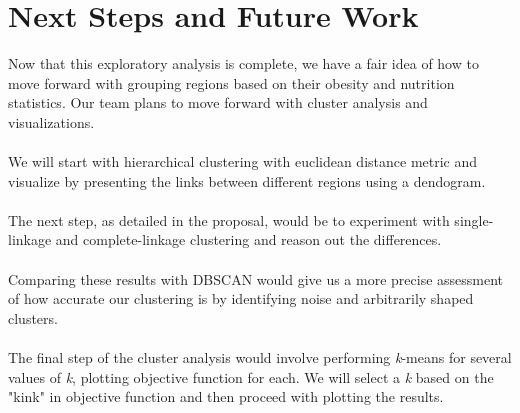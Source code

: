 \documentclass{article}
\begin{document}
	\section{Next Steps and Future Work}
		\label{futurework}
		Now that this exploratory analysis is complete, we have a fair idea of how to move forward with grouping regions based on their obesity and nutrition statistics. Our team plans to move forward with cluster analysis and visualizations. 
		\\\\
		We will start with hierarchical clustering with euclidean distance metric and visualize by presenting the links between different regions using a dendogram.
		\\\\
		The next step, as detailed in the proposal, would be to experiment with single-linkage and complete-linkage clustering and reason out the differences.
		\\\\
		Comparing these results with DBSCAN would give us a more precise assessment of how accurate our clustering is by identifying noise and arbitrarily shaped clusters.
		\\\\
		The final step of the cluster analysis would involve performing \textit{k}-means for several values of \textit{k}, plotting objective function for each. We will select a \textit{k} based on the "kink" in objective function and then proceed with plotting the results.
	
	
\end{document}
